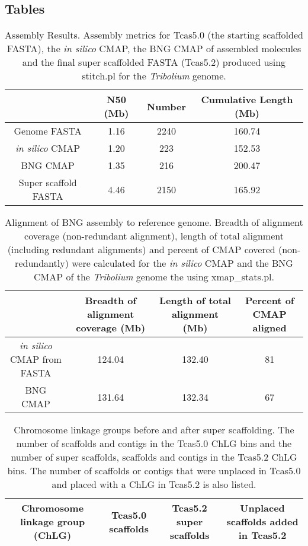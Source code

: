 \documentclass{bmcart}
\begin{document}
\begin{backmatter}
\section*{Tables}
\begin{table}[h!]
	\caption{Assembly Results. Assembly metrics for Tcas5.0 (the starting scaffolded FASTA), the \textit{in silico} CMAP, the BNG CMAP of assembled molecules and the final super scaffolded FASTA (Tcas5.2) produced using stitch.pl for the \textit{Tribolium} genome.}
	\begin{tabular}{cccc}
		\hline
		& N50 (Mb)  & Number & Cumulative Length (Mb)\\ \hline
		Genome FASTA & 1.16 & 2240 & 160.74\\
		\textit{in silico} CMAP & 1.20 &  223 & 152.53\\
		BNG CMAP & 1.35 &  216 & 200.47\\
		Super scaffold FASTA & 4.46 & 2150 & 165.92\\ \hline
	\end{tabular}
\end{table}
\begin{table}[h!]
\caption{Alignment of BNG assembly to reference genome. Breadth of alignment coverage (non-redundant alignment), length of total alignment (including redundant alignments) and percent of CMAP covered (non-redundantly) were calculated for the \textit{in silico} CMAP and the BNG CMAP of the \textit{Tribolium} genome the using xmap\_stats.pl.}
      \begin{tabular}{cccc}
        \hline
           & Breadth of alignment coverage (Mb) & Length of total alignment (Mb) & Percent of CMAP aligned \\ \hline
        \textit{in silico} CMAP from FASTA & 124.04 & 132.40 & 81 \\
        BNG CMAP & 131.64 & 132.34 & 67 \\ \hline
      \end{tabular}
\end{table}
\begin{table}[h!]
	\caption{Chromosome linkage groups before and after super scaffolding. The number of scaffolds and contigs in the Tcas5.0 ChLG bins and the number of super scaffolds, scaffolds and contigs in the Tcas5.2 ChLG bins. The number of scaffolds or contigs that were unplaced in Tcas5.0 and placed with a ChLG in Tcas5.2 is also listed. }
	\begin{tabular}{cccc}
		\hline
		Chromosome linkage group (ChLG) & Tcas5.0 scaffolds  & Tcas5.2 super scaffolds & Unplaced scaffolds added in Tcas5.2\\ \hline

\end{tabular}
\end{table}
\end{backmatter}
\end{document}
